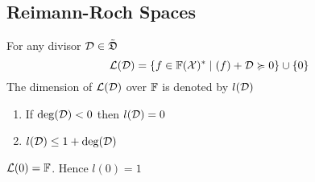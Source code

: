 \subsection{Reimann-Roch Spaces}
\begin{definition}
	For any divisor $\mathcal{D}\in \tilde{\mathfrak{D}}$ $$\mathcal{L}(\mathcal{D})=\{f\in \mathbb{F}(\mathcal{X})^*\mid (f)+\mathcal{D}\succcurlyeq 0 \}\cup \{0\}$$The dimension of $\mathcal{L}(\mathcal{D})$ over $\mathbb{F}$ is denoted by $l(\mathcal{D})$
\end{definition}
\begin{theorem}\label{rrspacedim}
	\begin{enumerate}[label=(\roman*)]
		\item If $\deg(\mathcal{D})<0$ then $l(\mathcal{D})=0$
		\item $l(\mathcal{D})\leq 1+\deg(\mathcal{D})$
	\end{enumerate}
\end{theorem}
\begin{theorem}\label{0divrrspacedim}
	$\mathcal{L}(0)=\mathbb{F}$. Hence $l(0)=1$
\end{theorem}


